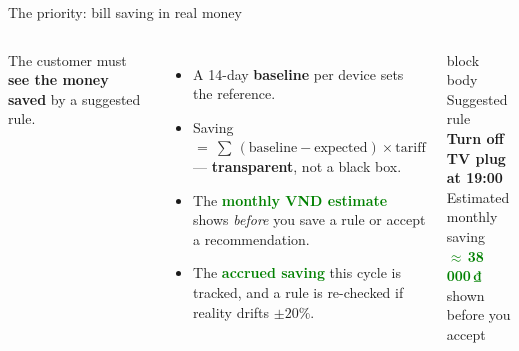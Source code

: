\documentclass[aspectratio=169,11pt]{beamer}
\newcommand{\kw}[1]{\textcolor{accent}{\textbf{#1}}}
\newcommand{\vnd}[1]{\textcolor{green}{\textbf{#1}}}
\begin{document}
\begin{frame}{The priority: bill saving in real money}
  \vspace{0.2em}
  \begin{columns}[T]
    The customer must \kw{see the money saved} by a suggested rule.
    \vspace{0.4em}
    \begin{itemize}\small\setlength\itemsep{0.45em}
      \item A 14-day \kw{baseline} per device sets the reference.
      \item Saving $=\ \sum\,(\text{baseline}-\text{expected})\times\text{tariff}$ —
            \kw{transparent}, not a black box.
      \item The \vnd{monthly VND estimate} shows \emph{before} you save a rule or accept
            a recommendation.
      \item The \vnd{accrued saving} this cycle is tracked, and a rule is re-checked if
            reality drifts $\pm20\%$.
    \end{itemize}
    \vspace{1.2em}
    \begin{beamercolorbox}[wd=\textwidth,sep=12pt,rounded=true]{block body}
      \centering
      {\small\color{mut}Suggested rule}\\[4pt]
      {\bfseries Turn off TV plug at 19:00}\\[10pt]
      {\small\color{mut}Estimated monthly saving}\\[2pt]
      {\Huge\vnd{$\approx$\,38\,000\,₫}}\\[6pt]
      {\scriptsize\color{mut}shown before you accept}
    \end{beamercolorbox}
  \end{columns}
\end{frame}
\end{document}
